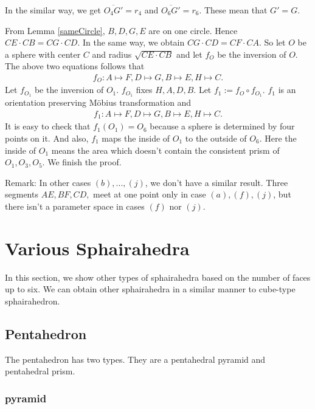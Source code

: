\documentclass[suppldata, dvipdfmx]{interact}
\theoremstyle{plain}%
\theoremstyle{definition}
\theoremstyle{remark}
\theoremstyle{problemstyle}
\begin{document}
In the similar way, we get $\overline{O_4G'} = r_4$ and 
$\overline{O_6G'} = r_6$. These mean that $G' = G$.

From Lemma \ref{sameCircle}, $B, D, G, E$ are on one circle. Hence
$CE \cdot CB = CG \cdot CD$. In the same way, we obtain 
$CG \cdot CD = CF \cdot CA$. So let $O$ be a sphere with center $C$ and
radius $\sqrt{CE \cdot CB}$ and let $f_O$ be the inversion of $O$.
The above two equations follows that
\begin{align*}
 f_O: A \mapsto F, D \mapsto G, B \mapsto E, H \mapsto C.
\end{align*}
Let $f_{O_1}$ be the inversion of $O_1$. $f_{O_1}$ fixes $H, A, D, B$.
Let $f_1 := f_O \circ f_{O_1}$.
$f_1$ is an orientation preserving M\"obius transformation and
\begin{align*}
 f_1 : A \mapsto F, D \mapsto G, B \mapsto E, H \mapsto C.
\end{align*}
It is easy to check that $f_1(O_1) = O_6$ because a sphere is determined
by four points on it. And also, $f_1$ maps the inside of $O_1$ to the
outside of $O_6$. Here the inside of $O_1$ means the area which doesn't
contain the consistent prism of $O_1, O_3, O_5$. We finish the
proof.

Remark:
In other cases $(b),...,(j)$, we don't have a similar result. Three
segments $AE, BF, CD,$ meet at one point only in case $(a), (f), (j)$, but
there isn't a parameter space in cases $(f)$ nor $(j)$.


\section{Various Sphairahedra}

In this section, we show other types of sphairahedra based on the
number of faces up to six.
We can obtain other sphairahedra in a similar manner to cube-type
sphairahedron.


\subsection{Pentahedron}

The pentahedron has two types. They are a pentahedral pyramid and pentahedral prism.

\subsubsection{pyramid}
\end{document}

